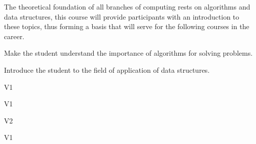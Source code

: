 \begin{syllabus}


\begin{justification}
The theoretical foundation of all branches of computing rests on algorithms and data structures, this course will provide participants with an introduction to these topics, thus forming a basis that will serve for the following courses in the career.
\end{justification}

\begin{goals}
\item Make the student understand the importance of algorithms for solving problems.
\item Introduce the student to the field of application of data structures.
\end{goals}

\begin{outcomes}{V1}
    \item {}
    \item {}
    \item {}
\end{outcomes}

\begin{specificoutcomes}{V1}
   \item {}
   \item {}
   \item {}
\end{specificoutcomes}

\begin{outcomes}{V2}
    \item {}
    \item {}
    \item {}
\end{outcomes}

\begin{competences}{V1}
    \item {}
    \item {}
    \item {}
    \item {}
\end{competences}


\end{syllabus}
